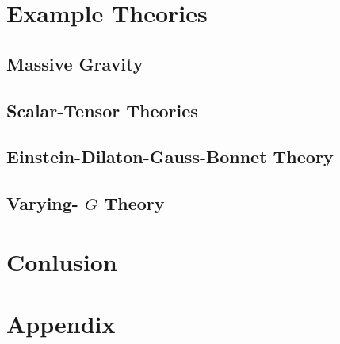 \documentclass[prd,twocolumn,nofootinbib]{revtex4-1}
\begin{document}
\section{Example Theories}
\subsection{Massive Gravity}
\subsection{Scalar-Tensor Theories}
\subsection{Einstein-Dilaton-Gauss-Bonnet Theory}
\subsection{Varying- $G$ Theory}
\section{Conlusion}
\section{Appendix}

\end{document}
